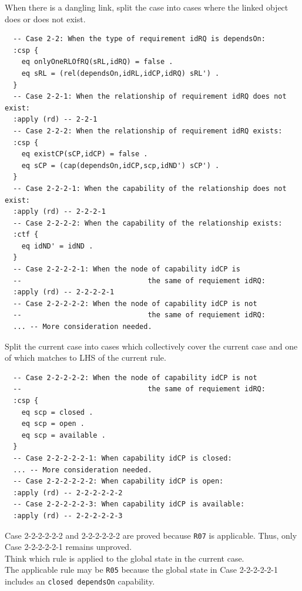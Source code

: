 \documentclass[12pt]{report}
\begin{document}
 When there is a dangling link, split the case
into cases where the linked object does or does not exist.
\small
\begin{verbatim}
  -- Case 2-2: When the type of requirement idRQ is dependsOn:
  :csp {
    eq onlyOneRLOfRQ(sRL,idRQ) = false .
    eq sRL = (rel(dependsOn,idRL,idCP,idRQ) sRL') .
  }
  -- Case 2-2-1: When the relationship of requirement idRQ does not exist:
  :apply (rd) -- 2-2-1
  -- Case 2-2-2: When the relationship of requirement idRQ exists:
  :csp {
    eq existCP(sCP,idCP) = false .
    eq sCP = (cap(dependsOn,idCP,scp,idND') sCP') .
  }
  -- Case 2-2-2-1: When the capability of the relationship does not exist:
  :apply (rd) -- 2-2-2-1
  -- Case 2-2-2-2: When the capability of the relationship exists:
  :ctf {
    eq idND' = idND .
  }
  -- Case 2-2-2-2-1: When the node of capability idCP is
  --                              the same of requiement idRQ:
  :apply (rd) -- 2-2-2-2-1
  -- Case 2-2-2-2-2: When the node of capability idCP is not
  --                              the same of requiement idRQ:
  ... -- More consideration needed.
\end{verbatim}
\normalsize
 Split the current case into cases which
collectively cover the current case and one of which matches to LHS of
the current rule. 
\small
\begin{verbatim}
  -- Case 2-2-2-2-2: When the node of capability idCP is not
  --                              the same of requiement idRQ:
  :csp {
    eq scp = closed .
    eq scp = open .
    eq scp = available .
  }
  -- Case 2-2-2-2-2-1: When capability idCP is closed:
  ... -- More consideration needed.
  -- Case 2-2-2-2-2-2: When capability idCP is open:
  :apply (rd) -- 2-2-2-2-2-2
  -- Case 2-2-2-2-2-3: When capability idCP is available:
  :apply (rd) -- 2-2-2-2-2-3
\end{verbatim}
\normalsize
Case 2-2-2-2-2-2 and 2-2-2-2-2-2 are proved because {\tt R07} is
applicable.  Thus, only Case 2-2-2-2-2-1 remains unproved.\\

 Think which rule is applied to the 
global state in the current case. \\
The applicable rule may be {\tt R05} because the global state in Case
2-2-2-2-2-1 includes an {\tt closed dependsOn} capability.\\
\end{document}
